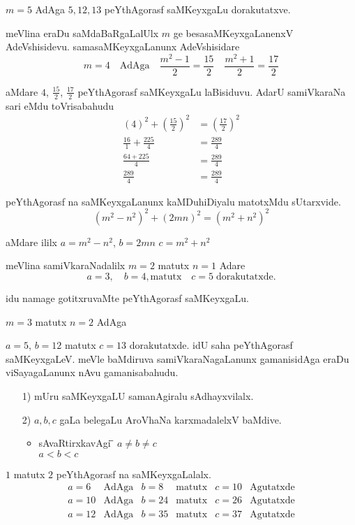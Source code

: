 $m=5$ AdAga $5,12,13$ peYthAgorasf saMKeyxgaLu dorakutatxve.

meVlina eraDu saMdaBaRgaLalUlx $m$ ge besasaMKeyxgaLanenxV AdeVshisidevu.
sama\-saMKeyxgaLanunx AdeVshisidare
$$
m=4 \quad \text{AdAga}\quad \frac{m^2-1}{2}=\frac{15}{2} \quad \frac{m^2+1}{2} = \frac{17}{2}
$$

aMdare $4$, $\frac{15}{2}$, $\frac{17}{2}$ peYthAgorasf saMKeyxgaLu laBisiduvu. AdarU samiVkaraNa sari eMdu toVrisabahudu
\begin{align*}
(4)^2+\left(\frac{15}{2}\right)^2 &= \left(\frac{17}{2}\right)^2\\
\frac{16}{1}+\frac{225}{4} &= \frac{289}{4}\\
\frac{64+225}{4} &= \frac{289}{4}\\
\frac{289}{4}&= \frac{289}{4}
\end{align*}

peYthAgorasf na saMKeyxgaLanunx kaMDuhiDiyalu matotxMdu sUtarxvide.
$$
\left(m^2-n^2\right)^2 + (2mn)^2 = (m^2+n^2)^2
$$

aMdare ililx\; $a=m^2-n^2$, \quad $b=2mn$ \quad {} \quad $c=m^2+n^2$

meVlina samiVkaraNadalilx $m=2$ matutx $n=1$ Adare
$$
a=3,\quad b=4, \text{matutx} \quad c=5 \; \text{dorakutatxde}.
$$

idu namage gotitxruvaMte peYthAgorasf saMKeyxgaLu.

$m=3$ \quad matutx \quad $n=2$ \quad AdAga

$a=5$, \quad $b=12$ \quad matutx\; $c=13$ \quad dorakutatxde. idU saha peYthAgorasf saMKeyxgaLeV. meVle baMdiruva samiVkaraNagaLanunx gamanisidAga eraDu viSayagaLanunx nAvu gamanisabahudu.
\begin{enumerate}
\item[{\rm 1)}] mUru saMKeyxgaLU samanAgiralu sAdhayxvilalx.
\item[{\rm 2)}] $a,b,c$ gaLa belegaLu AroVhaNa karxmadalelxV baMdive.
\begin{itemize}
\item \begin{tabbing}
sAvaRtirxkavAgi \;\;
\= \= $a\neq  b \neq c$ \\
\> \> $a < b < c$
 \end{tabbing} 
\end{itemize}
\end{enumerate}

$1$ matutx $2$ peYthAgorasf na saMKeyxgaLalalx.
$$
\begin{array}{lclclc}
a=6 & \text{AdAga} &  b=8  & \text{matutx}  & c=10 &\text{Agutatxde}\\  
a=10 & \text{AdAga} & b=24  & \text{matutx} & c=26 &\text{Agutatxde}\\ 
a=12 & \text{AdAga} & b=35  & \text{matutx} & c=37 &\text{Agutatxde}
\end{array}
$$

